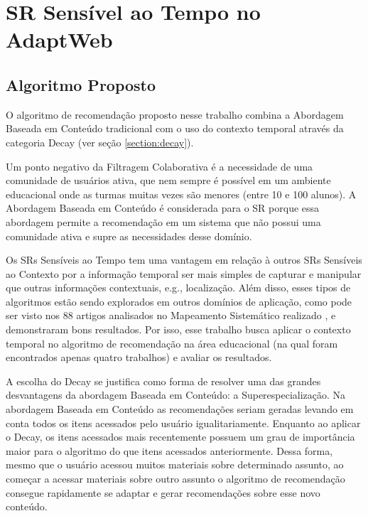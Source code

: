 \chapter{SR Sensível ao Tempo no AdaptWeb\textsuperscript{\textregistered}}

\section{Algoritmo Proposto}

O algoritmo de recomendação proposto nesse trabalho combina a Abordagem Baseada em Conteúdo tradicional com o uso do
contexto temporal através da categoria Decay (ver seção \ref{section:decay}).

Um ponto negativo da Filtragem Colaborativa é a necessidade de uma comunidade de usuários ativa, que nem sempre é
possível em um ambiente educacional onde as turmas muitas vezes são menores (entre 10 e 100 alunos). A Abordagem Baseada
em Conteúdo é considerada para o SR porque essa abordagem permite a recomendação em um sistema que não possui uma
comunidade ativa e supre as necessidades desse domínio.

Os SRs Sensíveis ao Tempo tem uma vantagem em relação à outros SRs Sensíveis ao Contexto por a informação temporal ser
mais simples de capturar e manipular que outras informações contextuais, e.g., localização. Além disso, esses tipos de
algoritmos estão sendo explorados em outros domínios de aplicação, como pode ser visto nos 88 artigos analisados no
Mapeamento Sistemático realizado \cite{de2017time}, e demonstraram bons resultados. Por isso, esse trabalho busca
aplicar o contexto temporal no algoritmo de recomendação na área educacional (na qual foram encontrados apenas quatro
trabalhos) e avaliar os resultados.

A escolha do Decay se justifica como forma de resolver uma das grandes desvantagens da abordagem Baseada em Conteúdo: a
Superespecialização. Na abordagem Baseada em Conteúdo as recomendações seriam geradas levando em conta todos os itens
acessados pelo usuário igualitariamente. Enquanto ao aplicar o Decay, os itens acessados mais recentemente possuem um
grau de importância maior para o algoritmo do que itens acessados anteriormente. Dessa forma, mesmo que o usuário
acessou muitos materiais sobre determinado assunto, ao começar a acessar materiais sobre outro assunto o algoritmo de
recomendação consegue rapidamente se adaptar e gerar recomendações sobre esse novo conteúdo.


